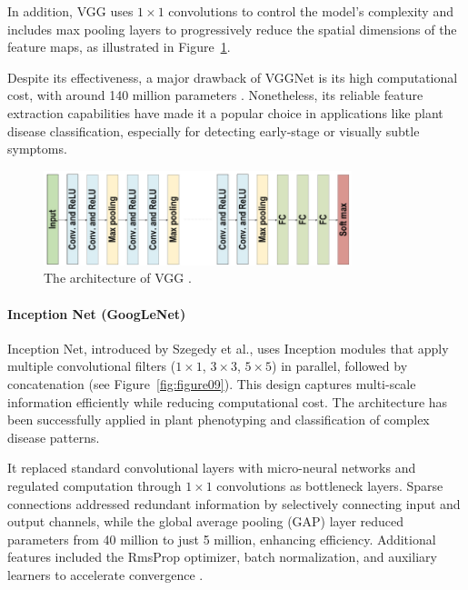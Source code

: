 In addition, VGG uses $1 \times 1$ convolutions to control the model’s complexity and includes max pooling layers to progressively reduce the spatial dimensions of the feature maps, as illustrated in Figure~\ref{fig:figure08}.

Despite its effectiveness, a major drawback of VGGNet is its high computational cost, with around 140 million parameters \parencite{alzubaidi2021review}. Nonetheless, its reliable feature extraction capabilities have made it a popular choice in applications like plant disease classification, especially for detecting early-stage or visually subtle symptoms.


\begin{figure}[H] %
    \centering
    \includegraphics[width=0.8\textwidth]{chapters/chapter1/images/Figure08.png}
    \caption{The architecture of VGG \parencite{alzubaidi2021review}.}
    \label{fig:figure08}
\end{figure}

\paragraph{Inception Net (GoogLeNet)}
Inception Net, introduced by Szegedy et al., uses Inception modules that apply multiple convolutional filters ($1 \times 1$, $3 \times 3$, $5 \times 5$) in parallel, followed by concatenation (see Figure~\ref{fig:figure09}). This design captures multi-scale information efficiently while reducing computational cost. The architecture has been successfully applied in plant phenotyping and classification of complex disease patterns.

It replaced standard convolutional layers with micro-neural networks and regulated computation through $1 \times 1$ convolutions as bottleneck layers. Sparse connections addressed redundant information by selectively connecting input and output channels, while the global average pooling (GAP) layer reduced parameters from 40 million to just 5 million, enhancing efficiency. Additional features included the RmsProp optimizer, batch normalization, and auxiliary learners to accelerate convergence \parencite{alzubaidi2021review}.



